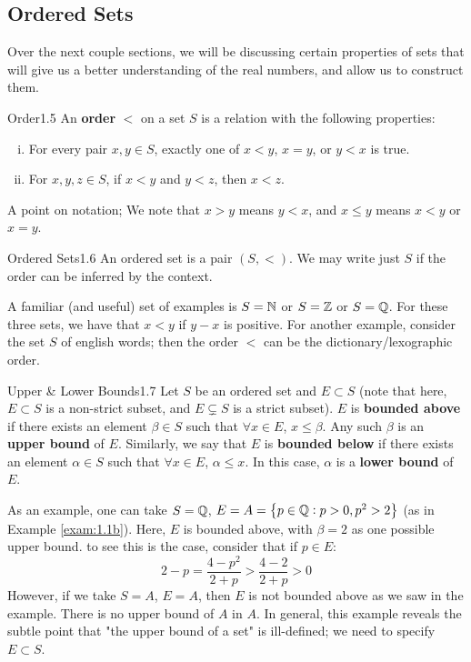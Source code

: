 \subsection{Ordered Sets}
Over the next couple sections, we will be discussing certain properties of sets that will give us a better understanding of the real numbers, and allow us to construct them.

\setcounter{rudin}{4}

\begin{definition}{Order}{1.5}
    An \textbf{order} $<$ on a set $S$ is a relation with the following properties:
    \begin{enumerate}[(i)]
        \item For every pair $x, y \in S$, exactly one of $x < y$, $x = y$, or $y < x$ is true. 
        \item For $x, y, z \in S$, if $x < y$ and $y < z$, then $x < z$. 
    \end{enumerate}
    A point on notation; We note that $x > y$ means $y < x$, and $x \leq y$ means $x < y$ or $x = y$. 
\end{definition}

\begin{definition}{Ordered Sets}{1.6}
    An ordered set is a pair $(S, <)$. We may write just $S$ if the order can be inferred by the context.
\end{definition}
A familiar (and useful) set of examples is $S = \mathbb{N}$ or $S = \mathbb{Z}$ or $S = \mathbb{Q}$. For these three sets, we have that $x < y$ if $y-x$ is positive. For another example, consider the set $S$ of english words; then the order $<$ can be the dictionary/lexographic order. 

\begin{definition}{Upper \& Lower Bounds}{1.7}
    Let $S$ be an ordered set and $E \subset S$ (note that here, $E \subset S$ is a non-strict subset, and $E \subsetneq S$ is a strict subset). $E$ is \textbf{bounded above} if there exists an element $\beta \in S$ such that $\forall x \in E$, $x \leq \beta$. Any such $\beta$ is an \textbf{upper bound} of $E$. Similarly, we say that $E$ is \textbf{bounded below} if there exists an element $\alpha \in S$ such that $\forall x \in E$, $\alpha \leq x$. In this case, $\alpha$ is a \textbf{lower bound} of $E$.
\end{definition}
As an example, one can take $S = \mathbb{Q}$, $E = A = \set{p \in \mathbb{Q}: p > 0, p^2 > 2}$ (as in Example \ref{exam:1.1b}). Here, $E$ is bounded above, with $\beta = 2$ as one possible upper bound. to see this is the case, consider that if $p \in E$:
\[2 - p = \frac{4 - p^2}{2+p} > \frac{4-2}{2+p} > 0\]
However, if we take $S = A$, $E = A$, then $E$ is not bounded above as we saw in the example. There is no upper bound of $A$ in $A$. In general, this example reveals the subtle point that "the upper bound of a set" is ill-defined; we need to specify $E \subset S$. 

